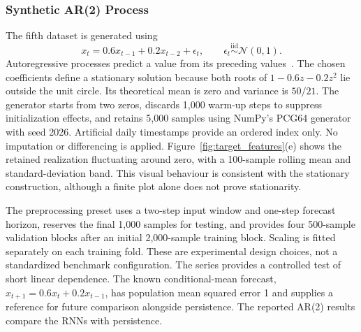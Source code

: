 \subsubsection{Synthetic AR(2) Process}
The fifth dataset is generated using
\begin{equation}
 x_t = 0.6x_{t-1} + 0.2x_{t-2} + \epsilon_t,
 \qquad \epsilon_t \overset{\mathrm{iid}}{\sim} \mathcal{N}(0,1).
\end{equation}
Autoregressive processes predict a value from its preceding
values~\cite{FPP3AR}. The chosen coefficients define a stationary solution
because both roots of $1-0.6z-0.2z^2$ lie outside the unit circle. Its
theoretical mean is zero and variance is $50/21$. The generator starts from two
zeros, discards 1,000 warm-up steps to suppress initialization effects, and
retains 5,000 samples using NumPy's PCG64 generator with seed 2026. Artificial
daily timestamps provide an ordered index only. No imputation or differencing is applied.
Figure~\ref{fig:target_features}(e) shows the retained realization fluctuating
around zero, with a 100-sample rolling mean and standard-deviation band. This
visual behaviour is consistent with the stationary construction, although a
finite plot alone does not prove stationarity.

The preprocessing preset uses a two-step input window and one-step forecast
horizon, reserves the final 1,000 samples for testing, and provides four
500-sample validation blocks after an initial 2,000-sample training block.
Scaling is fitted separately on each training fold. These are experimental
design choices, not a standardized benchmark configuration. The series provides
a controlled test of short linear dependence. The known conditional-mean
forecast, $\hat{x}_{t+1}=0.6x_t+0.2x_{t-1}$, has population mean squared error 1
and supplies a reference for future comparison alongside persistence. The
reported AR(2) results compare the RNNs with persistence.
